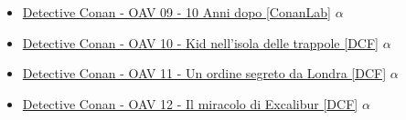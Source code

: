\begin{itemize}
				\item \href{https://mega.nz/#!0YEzgbyL!7Xqm70OWAodkNdJglfE669zQJYHXcT0whfwPQwrxeCY} {Detective Conan - OAV 09 - 10 Anni dopo [ConanLab]}  $\alpha$   \\ 
				\item \href{https://mega.nz/#!FQ9iHZib!mIVzoGiKR43tI_R5Q6W5mnL-ghuhdntoBuvyPOoKjHw} {Detective Conan - OAV 10 - Kid nell'isola delle trappole [DCF]}  $\alpha$   \\ 
				\item \href{https://mega.nz/#!MNtimAhC!XvaoCwqRVVdb30KPiosHoAw5Il8bybwLWaUytZiBEzg} {Detective Conan - OAV 11 - Un ordine segreto da Londra [DCF]}  $\alpha$   \\ 
				\item \href{https://mega.nz/#!kMERiLSb!lRnNxFeGIkbAV_H0cYfmrZ7VfanFr19jAvoyi9SqN8Q} {Detective Conan - OAV 12 - Il miracolo di Excalibur [DCF]}  $\alpha$   \\ 
			
			\end{itemize}
	
